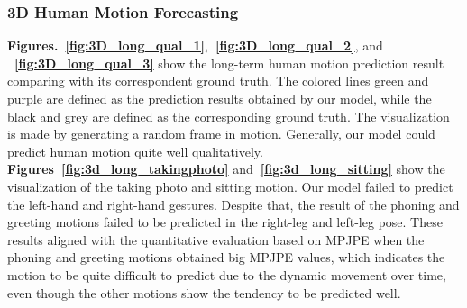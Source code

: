 \subsubsection{3D Human Motion Forecasting}\label{4:qual_3D}
\textbf{Figures.~\ref{fig:3D_long_qual_1}},\textbf{~\ref{fig:3D_long_qual_2}}, and \textbf{~\ref{fig:3D_long_qual_3}} show the long-term human motion prediction result comparing with its correspondent ground truth. The colored lines green and purple are defined as the prediction results obtained by our model, while the black and grey are defined as the corresponding ground truth. The visualization is made by generating a random frame in motion. Generally, our model could predict human motion quite well qualitatively. \textbf{Figures~\ref{fig:3d_long_takingphoto}} and\textbf{~\ref{fig:3d_long_sitting}} show the visualization of the taking photo and sitting motion. Our model failed to predict the left-hand and right-hand gestures. Despite that, the result of the phoning and greeting motions failed to be predicted in the right-leg and left-leg pose. These results aligned with the quantitative evaluation based on MPJPE when the phoning and greeting motions obtained big MPJPE values, which indicates the motion to be quite difficult to predict due to the dynamic movement over time, even though the other motions show the tendency to be predicted well.

